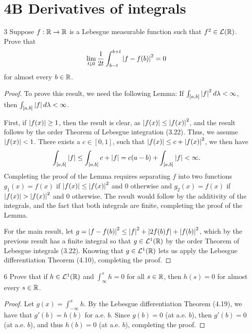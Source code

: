 \section{4B Derivatives of integrals}


\begin{exercise}{3}
Suppose $f: \mathbb{R} \to \mathbb{R}$ is a Lebesgue measurable function such that $f^2 \in \mathcal{L}(\mathbb{R})$.
Prove that
\begin{align*}
    \lim_{t \downarrow 0} \frac{1}{2t} \int_{b-t}^{b+t} \left\lvert f - f(b)\right\rvert^2 = 0
\end{align*}
for almost every $b \in \mathbb{R}$.
\end{exercise}
\begin{proof}
To prove this result, we need the following Lemma:
If $\int_{[a,b]} \left\lvert f\right\rvert^2 d\lambda < \infty$, then $\int_{[a,b]} \left\lvert f\right\rvert d\lambda < \infty$.

First, if $\left\lvert f(x)\right\rvert \geq 1$, then the result is clear, as $\left\lvert f(x)\right\rvert \leq \left\lvert f(x)\right\rvert^2$, and the result follows by the order Theorem of Lebesgue integration (3.22).
Thus, we assume $\left\lvert f(x)\right\rvert < 1$.
There exists a $c \in [0,1]$, such that $\left\lvert f(x)\right\rvert \leq c + \left\lvert f(x)\right\rvert^2$, we then have
\begin{align*}
    \int_{[a,b]} \left\lvert f\right\rvert
    \leq \int_{[a,b]} c + \left\lvert f\right\rvert
    = c(a-b) + \int_{[a,b]} \left\lvert f\right\rvert
    < \infty.
\end{align*}
Completing the proof of the Lemma requires separating $f$ into two functions $g_1(x) = f(x)$ if $\left\lvert f(x)\right\rvert \leq \left\lvert f(x)\right\rvert^2$ and 0 otherwise and $g_2(x) = f(x)$ if $\left\lvert f(x)\right\rvert > \left\lvert f(x)\right\rvert^2$ and 0 otherwise.
The result would follow by the additivity of the integrals, and the fact that both integrals are finite, completing the proof of the Lemma.

For the main result, let $g = \left\lvert f-f(b)\right\rvert^2 \leq \left\lvert f\right\rvert^2 + \left\lvert 2f(b)f\right\rvert + \left\lvert f(b)\right\rvert^2$, which by the previous result has a finite integral so that $g \in \mathcal{L}^1(\mathbb{R})$ by the order Theorem of Lebesgue integrals (3.22).
Knowing that $g \in \mathcal{L}^1(\mathbb{R})$ lets us apply the Lebesgue differentiation Theorem (4.10), completing the proof.
\end{proof} 

\begin{exercise}{6}
Prove that if $h \in \mathcal{L}^1(\mathbb{R})$ and $\int_\infty^s h = 0$ for all $s \in \mathbb{R}$, then $h(s) = 0$ for almost every $s \in \mathbb{R}$.
\end{exercise}
\begin{proof}
Let $g(x) = \int_{-\infty}^x h$.
By the Lebesgue differentiation Theorem (4.19), we have that $g'(b) = h(b)$ for a.e. $b$.
Since $g(b) = 0$ (at a.e. $b$), then $g'(b) = 0$ (at a.e. $b$), and thus $h(b) = 0$ (at a.e. $b$), completing the proof.
\end{proof} 

